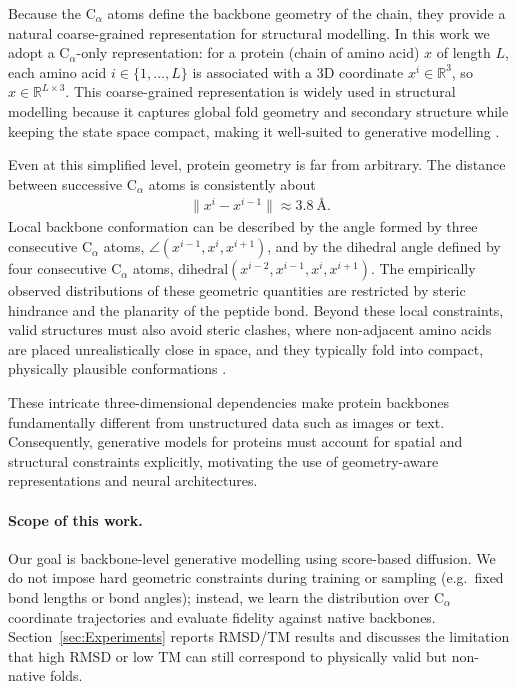\documentclass[a4paper,12pt]{article}
\begin{document}
Because the C\(_\alpha\) atoms define the backbone geometry of the chain, they provide a natural coarse-grained representation for structural modelling. In this work we adopt a C\(_\alpha\)-only representation: for a protein (chain of amino acid) \(x\) of length \(L\), each amino acid \(i \in \{1,\dots,L\}\) is associated with a 3D coordinate \(x^i \in \mathbb{R}^3\), so \(x\in\mathbb{R}^{L\times3}\). This coarse-grained representation is widely used in structural modelling because it captures global fold geometry and secondary structure while keeping the state space compact, making it well-suited to generative modelling \citep{watsonNovoDesignProtein2023,zhang2005TMalignProteinStructure,senior2020ImprovedProteinStructure}.

Even at this simplified level, protein geometry is far from arbitrary. The distance between successive C\(_\alpha\) atoms is consistently about
\begin{align*}
    \|x^i - x^{i-1}\| \approx 3.8~\text{\AA}.
\end{align*}
Local backbone conformation can be described by the angle formed by three consecutive C\(_\alpha\) atoms, \(\angle(x^{i-1}, x^i, x^{i+1})\), and by the dihedral angle defined by four consecutive C\(_\alpha\) atoms, \(\mathrm{dihedral}(x^{i-2}, x^{i-1}, x^i, x^{i+1})\). The empirically observed distributions of these geometric quantities are restricted by steric hindrance and the planarity of the peptide bond. Beyond these local constraints, valid structures must also avoid steric clashes, where non-adjacent amino acids are placed unrealistically close in space, and they typically fold into compact, physically plausible conformations \citep{creighton1993proteins,branden2012IntroductionProteinStructure}.

These intricate three-dimensional dependencies make protein backbones fundamentally different from unstructured data such as images or text. 
Consequently, generative models for proteins must account for spatial and structural constraints explicitly, motivating the use of geometry-aware representations and neural architectures.

\paragraph{Scope of this work.}
Our goal is backbone-level generative modelling using score-based diffusion. 
We do not impose hard geometric constraints during training or sampling (e.g.\ fixed bond lengths or bond angles); instead, we learn the distribution over C\(_\alpha\) coordinate trajectories and evaluate fidelity against native backbones. 
Section~\ref{sec:Experiments} reports RMSD/TM results and discusses the limitation that high RMSD or low TM can still correspond to physically valid but non-native folds.
\end{document}
